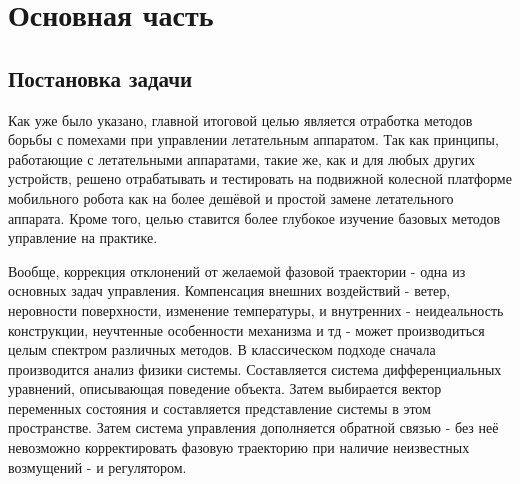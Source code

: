 \documentclass[14pt,a4paper,russian]{scrartcl}
\begin{document}
\section*{Основная часть}
\subsection{Постановка задачи}

Как уже было указано, главной итоговой целью является отработка методов
борьбы с помехами при управлении летательным аппаратом. Так как принципы,
работающие с летательными аппаратами, такие же, как и для любых других устройств,
решено отрабатывать и тестировать на подвижной колесной платформе мобильного робота
как на более дешёвой и простой замене летательного аппарата. Кроме того, целью ставится
более глубокое изучение базовых методов управление на практике.

Вообще, коррекция отклонений от желаемой фазовой траектории - одна из основных
задач управления. Компенсация внешних воздействий - ветер, неровности поверхности,
изменение температуры, и внутренних - неидеальность конструкции, неучтенные особенности
механизма и тд - может производиться целым спектром различных методов.
В классическом подходе сначала производится анализ физики системы. Составляется
система дифференциальных уравнений, описывающая поведение объекта. Затем выбирается
вектор переменных состояния и составляется представление системы в этом пространстве.
Затем система управления дополняется обратной связью - без неё невозможно
корректировать фазовую траекторию при наличие неизвестных возмущений - и регулятором.
\end{document}
